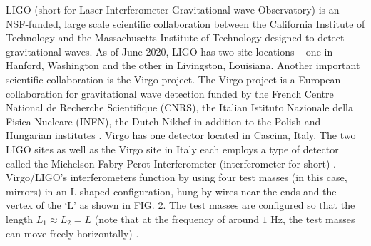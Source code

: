 \documentclass[preprint,
letterpaper,
 amsmath,amssymb,
 aps,
]{revtex4-2}
\begin{document}
LIGO (short for Laser Interferometer Gravitational-wave Observatory) is an NSF-funded, large scale scientific collaboration between the California Institute of Technology and the Massachusetts Institute of Technology designed to detect gravitational waves. As of June 2020, LIGO has two site locations – one in Hanford, Washington and the other in Livingston, Louisiana. Another important scientific collaboration is the Virgo project. The Virgo project is a European collaboration for gravitational wave detection funded by the French Centre National de Recherche Scientifique (CNRS), the Italian Istituto Nazionale della Fisica Nucleare (INFN), the Dutch Nikhef in addition to the Polish and Hungarian institutes \cite{collaboration2019open}. Virgo has one detector located in Cascina, Italy. The two LIGO sites as well as the Virgo site in Italy each employs a type of detector called the Michelson Fabry-Perot Interferometer (interferometer for short) \cite{creighton_anderson_2011}. Virgo/LIGO's interferometers function by using four test masses (in this case, mirrors) in an L-shaped configuration, hung by wires near the ends and the vertex of the `L' as shown in FIG. 2. The test masses are configured so that the length $L_1 \approx L_2 = L$ (note that at the frequency of around $1$ Hz, the test masses can move freely horizontally) \cite{JSTORLIGO}. 
\end{document}
